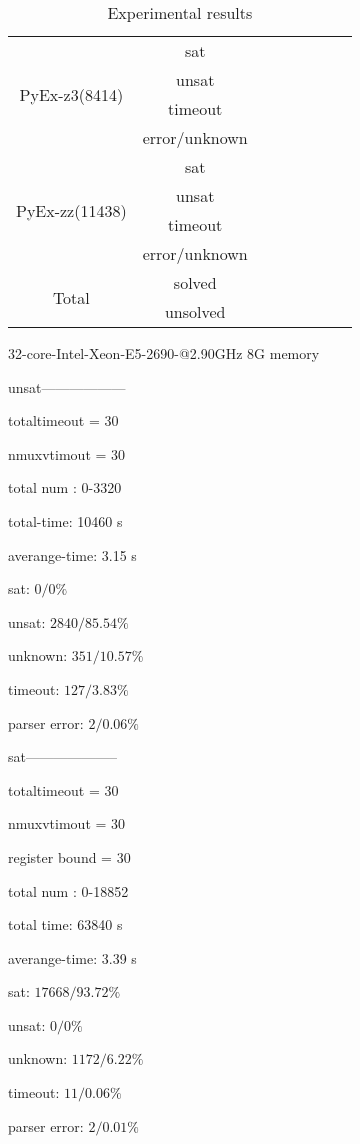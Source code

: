 \begin{table}[htbp]
\begin{center}
\begin{tabular}{|c|c|c|c|c|c|c|c|}
\hline
\multirow{4}{*}{PyEx-z3(8414)} & sat &  &  &  &  & &\\
\cline{2-8}
 & unsat &  &  &  &  & &\\
\cline{2-8}
 & timeout &  &  &  &  & &\\
\cline{2-8}
 & error/unknown &  &  &  &  & &\\
\hline
\multirow{4}{*}{PyEx-zz(11438)} & sat &  &  &  &  & &\\
\cline{2-8}
 & unsat &  &  &  &  & &\\
\cline{2-8}
 & timeout &  &  &  &  & &\\
\cline{2-8}
 & error/unknown &  &  &  &  & &\\
\hline
\multirow{2}{*}{Total} & solved &  &  &  &  & &\\
\cline{2-8}
& unsolved &  &  &  &  & &\\
\hline
\end{tabular}
\end{center}
\caption{Experimental results}
\label{tab-experiment}
\end{table}%



32-core-Intel-Xeon-E5-2690-@2.90GHz
8G memory

unsat------------------

totaltimeout = 30

nmuxvtimout = 30

total num : 0-3320

total-time: 10460 s

averange-time: 3.15 s 

sat: $0 / 0\%$

unsat: $2840 / 85.54\%$

unknown: $351 / 10.57\%$

timeout: $127 / 3.83\%$

parser error: $2 / 0.06\%$

sat--------------------

totaltimeout = 30

nmuxvtimout = 30

register bound = 30

total num : 0-18852

total time: 63840 s

averange-time: 3.39 s 

sat: $17668 / 93.72\%$

unsat: $0 / 0\%$


unknown: $1172 / 6.22\%$

timeout: $11 / 0.06\%$

parser error: $2 / 0.01\%$